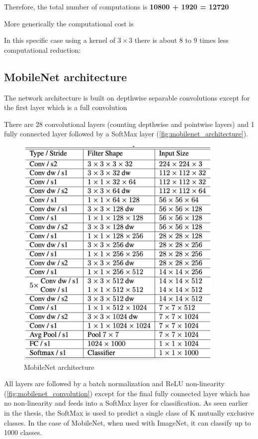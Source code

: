 Therefore, the total number of computations is \textbf{10800 + 1920 = 12720}

More generically the computational cost is 

In this specific case using a kernel of $3 \times 3$ there is about 8 to 9
times less computational reduction: 

\subsection{MobileNet architecture}
The network architecture is built on depthwise separable convolutions except
for the first layer which is a full convolution

There are 28 convolutional layers (counting depthwise and pointwise layers) and
1 fully connected layer followed by a SoftMax layer
(\autoref{fig:mobilenet_architecture}).

\begin{figure}[ht]
    \includegraphics[width=10cm]{images/experiments/mobilenet_architecture.png}
    \centering
    \caption{MobileNet architecture}\label{fig:mobilenet_architecture}
\end{figure}

All layers are followed by a batch normalization and ReLU non-linearity
(\autoref{fig:mobilenet_convolution}) except for the final fully connected
layer which has no non-linearity and feeds into a SoftMax layer for
classification.
As seen earlier in the thesis, the SoftMax is used to predict a single class of
K mutually exclusive classes. In the case of MobileNet, when used with
ImageNet, it can classify up to 1000 classes.

